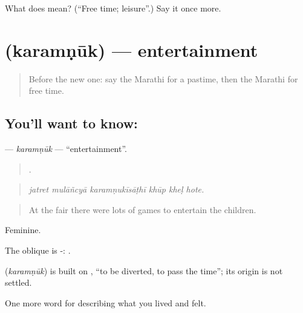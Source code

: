 \begin{tcolorbox}[breakable,colback=teal!4,colframe=teal!35!black,title={Before you move on}]
What does  mean? (\textquotedblleft{}Free time; leisure\textquotedblright{}.) Say it once more.
\end{tcolorbox}
\section[\texorpdfstring{\mr{करमणूक} (karamṇūk)}{करमणूक (karamṇūk)}]{ (karamṇūk) — entertainment}

\label{lesson:MR-C528-karamnuk}



\begin{quote}
Before the new one: say the Marathi for a pastime, then the Marathi for free time.
\end{quote}

\subsection*{You'll want to know: }
\textbf{} — \emph{karamṇūk} — \textquotedblleft{}entertainment\textquotedblright{}.

\begin{quote}
     .
\end{quote}

\begin{quote}
\emph{jatret mulāñcyā karamṇukīsāṭhī khūp kheḷ hote.}
\end{quote}

\begin{quote}
At the fair there were lots of games to entertain the children.
\end{quote}

Feminine.

The oblique is -: .

\begin{cousinweb}
\textbf{} (\emph{karamṇūk}) is built on , \textquotedblleft{}to be diverted, to pass the time\textquotedblright{}; its origin is not settled.
\end{cousinweb}

\begin{grammarlens}[title={What you've built}]
One more word for describing what you lived and felt.
\end{grammarlens}

